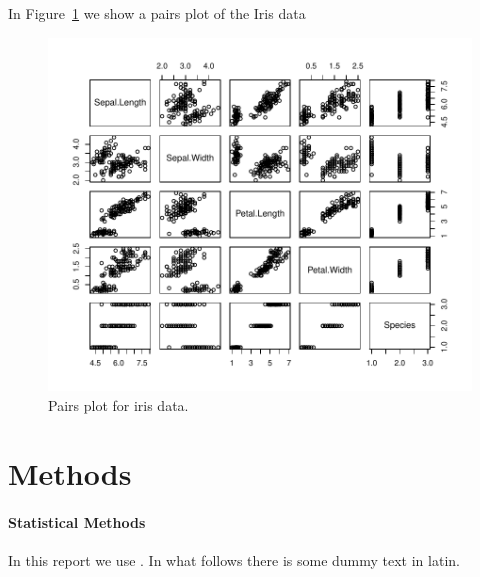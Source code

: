 \documentclass[11pt,a4paper,twoside]{article}\usepackage[]{graphicx}\usepackage[]{color}
\makeatletter
\def\maxwidth{ %
  \ifdim\Gin@nat@width>\linewidth
    \linewidth
  \else
    \Gin@nat@width
  \fi
}
\newenvironment{knitrout}{}{} %
\makeatother
\begin{document}

In Figure~\ref{fig:pairs} we show a pairs plot of the Iris data


\begin{figure}[!ht]
\begin{center}
\begin{knitrout}
\color{fgcolor}
\includegraphics[width=\maxwidth]{plots/pplot-1} 

\end{knitrout}
\end{center}
\caption{Pairs plot for iris data.}
\label{fig:pairs}
\end{figure}

\section{Methods}\label{sec:methods}

\paragraph{Statistical Methods}

In this report we use \cite{R}. In what follows there is some
dummy text in latin.
\end{document}
